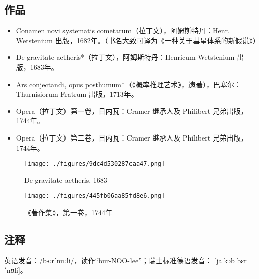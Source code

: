 \subsection{作品}
\begin{itemize}
\item Conamen novi systematis cometarum（拉丁文），阿姆斯特丹：Henr. Wetstenium 出版，1682年。（书名大致可译为《一种关于彗星体系的新假说》）
\item De gravitate aetheris*（拉丁文），阿姆斯特丹：Henricum Wetstenium 出版，1683年。
\item Ars conjectandi, opus posthumum*（《概率推理艺术》，遗著），巴塞尔：Thurnisiorum Fratrum 出版，1713年。
\item Opera（拉丁文）第一卷，日内瓦：Cramer 继承人及 Philibert 兄弟出版，1744年。
\item Opera（拉丁文）第二卷，日内瓦：Cramer 继承人及 Philibert 兄弟出版，1744年。
\end{itemize}
\begin{figure}[ht]
\centering
\texttt{[image: ./figures/9dc4d530287caa47.png]}
\caption{De gravitate aetheris, 1683} \label{fig_YGBbnl_6}
\end{figure}
\begin{figure}[ht]
\centering
\texttt{[image: ./figures/445fb06aa85fd8e6.png]}
\caption{《著作集》，第一卷，1744年} \label{fig_YGBbnl_5}
\end{figure}
\subsection{注释}
英语发音：/bɜːrˈnuːli/，读作“bur-NOO-lee”；瑞士标准德语发音：[ˈjaːkɔb bɛrˈnʊli]。
